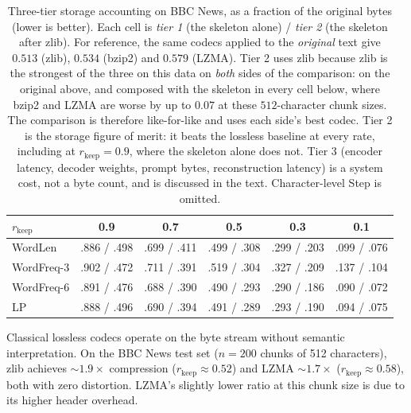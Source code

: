 \documentclass[11pt]{article}
\newcommand{\rkeep}{r_{\mathrm{keep}}}
\begin{document}
\begin{table}[tbp]
\centering
\small
\setlength{\tabcolsep}{4pt}
\caption{Three-tier storage accounting on BBC News, as a fraction of the original bytes (lower is better).
Each cell is \emph{tier 1} (the skeleton alone) / \emph{tier 2} (the skeleton after zlib). For reference,
the same codecs applied to the \emph{original} text give $0.513$ (zlib), $0.534$ (bzip2) and $0.579$ (LZMA).
Tier 2 uses zlib because zlib is the strongest of the three on this data on \emph{both} sides of the
comparison: on the original above, and composed with the skeleton in every cell below, where bzip2 and
LZMA are worse by up to $0.07$ at these $512$-character chunk sizes. The comparison is therefore
like-for-like and uses each side's best codec.
Tier 2 is the storage figure of merit: it beats the lossless baseline at every rate, including at
$\rkeep = 0.9$, where the skeleton alone does not. Tier 3 (encoder latency, decoder weights, prompt bytes, reconstruction
latency) is a system cost, not a byte count, and is discussed in the text. Character-level Step is omitted.}
\label{tab:tiers}
\begin{tabular}{lccccc}
\toprule
$\rkeep$ & 0.9 & 0.7 & 0.5 & 0.3 & 0.1 \\
\midrule
WordLen     & .886 / .498 & .699 / .411 & .499 / .308 & .299 / .203 & .099 / .076 \\
WordFreq-3  & .902 / .472 & .711 / .391 & .519 / .304 & .327 / .209 & .137 / .104 \\
WordFreq-6  & .891 / .476 & .688 / .390 & .490 / .293 & .290 / .186 & .090 / .072 \\
LP          & .888 / .496 & .690 / .394 & .491 / .289 & .293 / .190 & .094 / .075 \\
\bottomrule
\end{tabular}
\end{table}

Classical lossless codecs operate on the byte stream without semantic interpretation.
On the BBC News test set ($n{=}200$ chunks of 512 characters),
zlib achieves ${\sim}1.9\times$ compression ($\rkeep \approx 0.52$) and
LZMA ${\sim}1.7\times$ ($\rkeep \approx 0.58$), both with zero distortion.
LZMA's slightly lower ratio at this chunk size is due to its higher header overhead.
\end{document}
